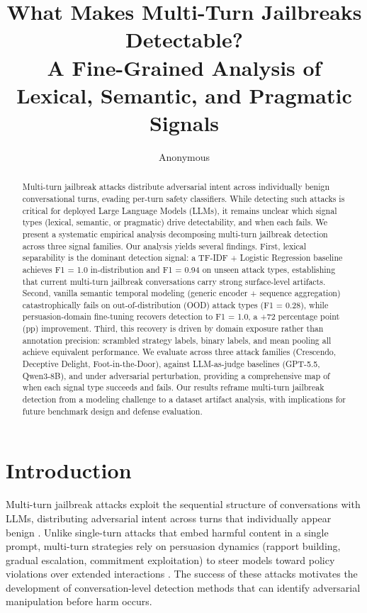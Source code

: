 \documentclass[11pt]{article}
\title{What Makes Multi-Turn Jailbreaks Detectable?\\A Fine-Grained Analysis of Lexical, Semantic, and Pragmatic Signals}
\author{Anonymous}
\date{}
\begin{document}
\maketitle

\begin{abstract}
Multi-turn jailbreak attacks distribute adversarial intent across individually benign conversational turns, evading per-turn safety classifiers. While detecting such attacks is critical for deployed Large Language Models (LLMs), it remains unclear which signal types (lexical, semantic, or pragmatic) drive detectability, and when each fails. We present a systematic empirical analysis decomposing multi-turn jailbreak detection across three signal families. Our analysis yields several findings. First, lexical separability is the dominant detection signal: a TF-IDF + Logistic Regression baseline achieves F1 = 1.0 in-distribution and F1 = 0.94 on unseen attack types, establishing that current multi-turn jailbreak conversations carry strong surface-level artifacts. Second, vanilla semantic temporal modeling (generic encoder + sequence aggregation) catastrophically fails on out-of-distribution (OOD) attack types (F1 = 0.28), while persuasion-domain fine-tuning recovers detection to F1 = 1.0, a +72 percentage point (pp) improvement. Third, this recovery is driven by domain exposure rather than annotation precision: scrambled strategy labels, binary labels, and mean pooling all achieve equivalent performance. We evaluate across three attack families (Crescendo, Deceptive Delight, Foot-in-the-Door), against LLM-as-judge baselines (GPT-5.5, Qwen3-8B), and under adversarial perturbation, providing a comprehensive map of when each signal type succeeds and fails. Our results reframe multi-turn jailbreak detection from a modeling challenge to a dataset artifact analysis, with implications for future benchmark design and defense evaluation.
\end{abstract}

\section{Introduction}

Multi-turn jailbreak attacks exploit the sequential structure of conversations with LLMs, distributing adversarial intent across turns that individually appear benign \citep{russinovich2024crescendo,jiang2024fitd}. Unlike single-turn attacks that embed harmful content in a single prompt, multi-turn strategies rely on persuasion dynamics (rapport building, gradual escalation, commitment exploitation) to steer models toward policy violations over extended interactions \citep{zeng2024persuasion,hagendorff2026persuasion}. The success of these attacks motivates the development of conversation-level detection methods that can identify adversarial manipulation before harm occurs.
\end{document}
